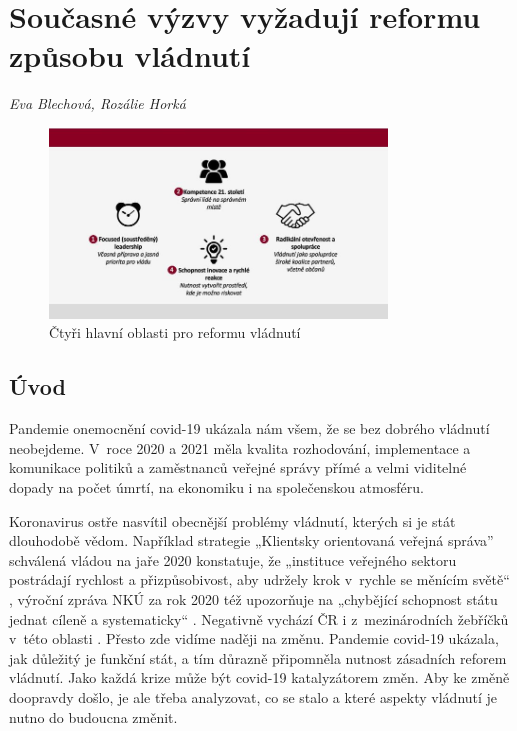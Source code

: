 
\chapter[Současné výzvy vyžadují reformu vládnutí]{Současné výzvy vyžadují reformu způsobu vládnutí}
\label{Nove_vyzvy}

\textit{Eva Blechová, Rozálie Horká}
\vspace{15mm}

\begin{figure}
    \centering
    \includegraphics[width=0.8\textwidth]{pic/evaschema.jpg}
    \caption{Čtyři hlavní oblasti pro reformu vládnutí}
    \label{fig:ctyrioblasti}
\end{figure}

\section*{Úvod} 

Pandemie onemocnění covid-19 ukázala nám všem, že se bez dobrého vládnutí neobejdeme. V~roce 2020 a 2021 měla kvalita rozhodování, implementace a komunikace politiků a zaměstnanců veřejné správy přímé a velmi viditelné dopady na počet úmrtí, na ekonomiku i na společenskou atmosféru.

Koronavirus ostře nasvítil obecnější problémy vládnutí, kterých si je stát dlouhodobě vědom. Například strategie „Klientsky orientovaná veřejná správa” schválená vládou na jaře 2020 konstatuje, že „instituce veřejného sektoru postrádají rychlost a přizpůsobivost, aby udržely krok v~rychle se měnícím světě“ \cite{ministerstvo_pro_mistni_rozvoj_cr_ministerstvo_2020}, výroční zpráva NKÚ za rok 2020 též upozorňuje na „chybějící schopnost státu jednat cíleně a systematicky“ \cite{nejvyssi-kontrolni-urad_vyrocni_2020}. Negativně vychází ČR i z~mezinárodních žebříčků v~této oblasti \cite{wef_global_2019}. Přesto zde vidíme naději na změnu. Pandemie covid-19 ukázala, jak důležitý je funkční stát, a tím důrazně připomněla nutnost zásadních reforem vládnutí. Jako každá krize může být covid-19 katalyzátorem změn. Aby ke změně doopravdy došlo, je ale třeba analyzovat, co se stalo a které aspekty vládnutí je nutno do budoucna změnit.


